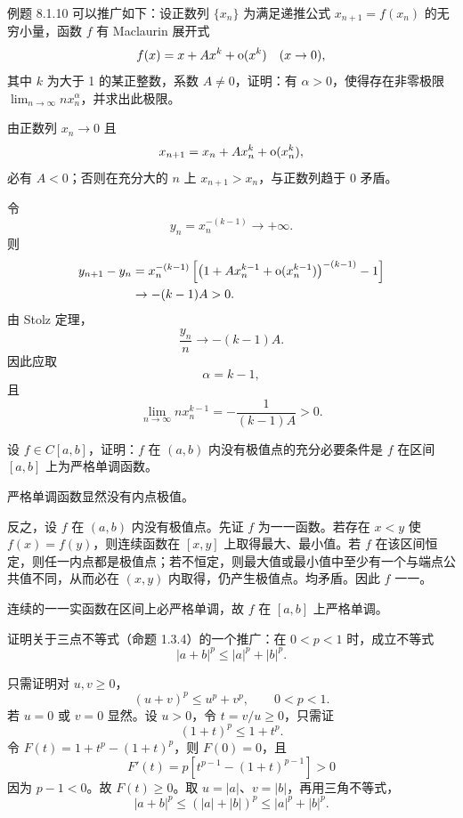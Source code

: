 \begin{xreferenceproblem}[3]
例题 8.1.10 可以推广如下：设正数列 $\{x_n\}$ 为满足递推公式 $x_{n+1}=f(x_n)$ 的无穷小量，函数 $f$ 有 Maclaurin 展开式
  \[
    f(x)=x+Ax^k+\mathrm{o}(x^k)\quad(x\to0),
  \]
  其中 $k$ 为大于 1 的某正整数，系数 $A\ne0$，证明：有 $\alpha>0$，使得存在非零极限 $\displaystyle\lim_{n\to\infty}nx_n^\alpha$，并求出此极限。
\end{xreferenceproblem}
\begin{xsolution}
由正数列 $x_n\to0$ 且
\[
  x_{n+1}=x_n+Ax_n^k+\mathrm{o}(x_n^k),
\]
必有 $A<0$；否则在充分大的 $n$ 上 $x_{n+1}>x_n$，与正数列趋于 0 矛盾。

令
\[
  y_n=x_n^{-(k-1)}\to+\infty.
\]
则
\begin{align*}
  y_{n+1}-y_n
  &=x_n^{-(k-1)}
  \left[
    \left(1+Ax_n^{k-1}+\mathrm{o}(x_n^{k-1})\right)^{-(k-1)}-1
  \right]\\
  &\to-(k-1)A>0.
\end{align*}
由 Stolz 定理，
\[
  \frac{y_n}{n}\to-(k-1)A.
\]
因此应取
\[
  \boxed{\alpha=k-1},
\]
且
\[
  \boxed{\lim_{n\to\infty}n x_n^{k-1}
  =-\frac1{(k-1)A}>0}.
\]
\end{xsolution}


\begin{xreferenceproblem}[4]
设 $f\in C[a,b]$，证明：$f$ 在 $(a,b)$ 内没有极值点的充分必要条件是 $f$ 在区间 $[a,b]$ 上为严格单调函数。
\end{xreferenceproblem}
\begin{xsolution}
严格单调函数显然没有内点极值。

反之，设 $f$ 在 $(a,b)$ 内没有极值点。先证 $f$ 为一一函数。若存在 $x<y$ 使 $f(x)=f(y)$，则连续函数在 $[x,y]$ 上取得最大、最小值。若 $f$ 在该区间恒定，则任一内点都是极值点；若不恒定，则最大值或最小值中至少有一个与端点公共值不同，从而必在 $(x,y)$ 内取得，仍产生极值点。均矛盾。因此 $f$ 一一。

连续的一一实函数在区间上必严格单调，故 $f$ 在 $[a,b]$ 上严格单调。
\end{xsolution}


\begin{xreferenceproblem}[5]
证明关于三点不等式（命题 1.3.4）的一个推广：在 $0<p<1$ 时，成立不等式
  \[
    |a+b|^p\le|a|^p+|b|^p.
  \]
\end{xreferenceproblem}
\begin{xsolution}
只需证明对 $u,v\ge0$，
\[
  (u+v)^p\le u^p+v^p,
  \qquad0<p<1.
\]
若 $u=0$ 或 $v=0$ 显然。设 $u>0$，令 $t=v/u\ge0$，只需证
\[
  (1+t)^p\le1+t^p.
\]
令 $F(t)=1+t^p-(1+t)^p$，则 $F(0)=0$，且
\[
  F'(t)=p[t^{p-1}-(1+t)^{p-1}]>0
\]
因为 $p-1<0$。故 $F(t)\ge0$。取 $u=|a|$、$v=|b|$，再用三角不等式，
\[
  |a+b|^p\le(|a|+|b|)^p\le|a|^p+|b|^p.
\]
\end{xsolution}


